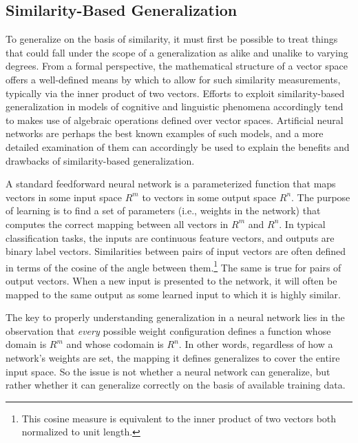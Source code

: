\subsection{Similarity-Based Generalization}

To generalize on the basis of similarity, it must first be possible to treat things that could fall under the scope of a generalization as alike and unalike to varying degrees. From a formal perspective, the mathematical structure of a vector space offers a well-defined means by which to allow for such similarity measurements, typically via the inner product of two vectors. Efforts to exploit similarity-based generalization in models of cognitive and linguistic phenomena accordingly tend to makes use of algebraic operations defined over vector spaces. Artificial neural networks are perhaps the best known examples of such models, and a more detailed examination of them can accordingly be used to explain the benefits and drawbacks of similarity-based generalization.

A standard feedforward neural network is a parameterized function that maps vectors in some input space $R^m$ to vectors in some output space $R^n$. The purpose of learning is to find a set of parameters (i.e., weights in the network) that computes the correct mapping between all vectors in $R^m$ and $R^n$. In typical classification tasks, the inputs are continuous feature vectors, and outputs are binary label vectors. Similarities between pairs of input vectors are often defined in terms of the cosine of the angle between them.\footnote{This cosine measure is equivalent to the inner product of two vectors both normalized to unit length.} The same is true for pairs of output vectors. When a new input is presented to the network, it will often be mapped to the same output as some learned input to which it is highly similar. 

The key to properly understanding generalization in a neural network lies in the observation that \textit{every} possible weight configuration defines a function whose domain is $R^m$ and whose codomain is $R^n$. In other words, regardless of how a network's weights are set, the mapping it defines generalizes to cover the entire input space. So the issue is not whether a neural network can generalize, but rather whether it can generalize correctly on the basis of available training data. 

